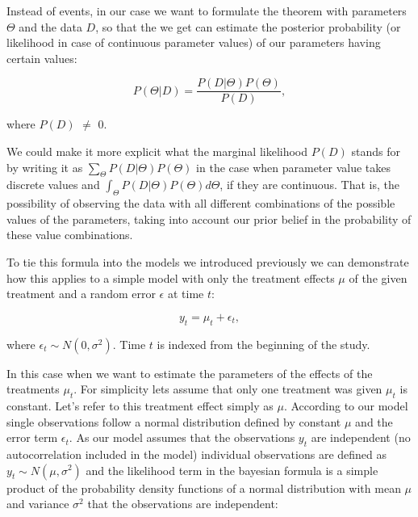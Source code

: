 \documentclass[12pt,a4paper,leqno]{report}
\theoremstyle{plain}
\theoremstyle{definition}
\theoremstyle{remark}
\begin{document}
Instead of events, in our case we want to formulate the theorem with parameters \(\Theta
\) and the data \(D\), so that the we get can estimate the posterior probability (or
likelihood in case of continuous parameter values) of our parameters having certain
values:

\begin{def}\label{}
    \begin{equation}
        P(\Theta|D) = \frac{P(D|\Theta)P(\Theta)}{P(D)},
    \end{equation}
\end{def}where \(P(D)\) \(\neq \) 0.

We could make it more explicit what the marginal likelihood \(P(D)\) stands for by
writing it as \(\sum_\Theta P(D|\Theta)P(\Theta)\) in the case when parameter value takes
discrete values and \(\int_\Theta P(D|\Theta)P(\Theta) d\Theta \), if they are
continuous. That is, the possibility of observing the data with all different
combinations of the possible values of the parameters, taking into account our prior
belief in the probability of these value combinations.

To tie this formula into the models we introduced previously we can demonstrate how this
applies to a simple model with only the treatment effects \(\mu \) of the given treatment
and a random error \(\epsilon \) at time \(t\):

\begin{def}\label{}
    \begin{equation}\label{}
        y_t = \mu_t + \epsilon_t,
    \end{equation}
\end{def}where \(\epsilon_{t} \sim N(0,\sigma^2)\). Time \(t\) is indexed from the
beginning of the study.

In this case when we want to estimate the parameters of the effects of the treatments
\(\mu_t\). For simplicity lets assume that only one treatment was given \(\mu_t\) is
constant. Let's refer to this treatment effect simply as \(\mu \). According to our model
single observations follow a normal distribution defined by constant \(\mu \) and the
error term \(\epsilon_t \). As our model assumes that the observations \(y_t\) are
independent (no autocorrelation included in the model) individual observations are
defined as \(y_t \sim N(\mu,\sigma^2) \) and the likelihood term in the bayesian formula
is a simple product of the probability density functions of a normal distribution with
mean \(\mu \) and variance \(\sigma^2 \) that the observations are independent:
\end{document}
